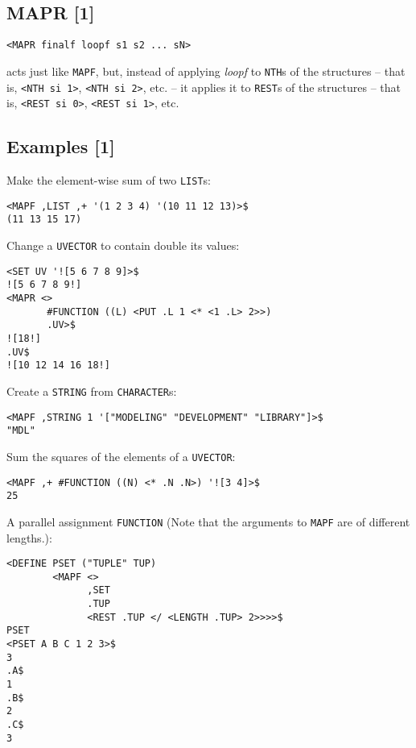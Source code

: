 \documentclass[a4paper]{scrbook}
\begin{document}
\subsection{MAPR {[}1{]}}\label{mapr-1}

\begin{verbatim}
<MAPR finalf loopf s1 s2 ... sN>
\end{verbatim}

 acts just like \texttt{MAPF}, but, instead of applying \emph{loopf} to \texttt{NTH}s of the
structures -- that is, \texttt{\textless{}NTH\ si\ 1\textgreater{}}, \texttt{\textless{}NTH\ si\ 2\textgreater{}}, etc. --
it applies it to \texttt{REST}s of the structures -- that is, \texttt{\textless{}REST\ si\ 0\textgreater{}},
\texttt{\textless{}REST\ si\ 1\textgreater{}}, etc.

\subsection{Examples {[}1{]}}\label{examples-1-3}

Make the element-wise sum of two \texttt{LIST}s:

\begin{verbatim}
<MAPF ,LIST ,+ '(1 2 3 4) '(10 11 12 13)>$
(11 13 15 17)
\end{verbatim}

Change a \texttt{UVECTOR} to contain double its values:

\begin{verbatim}
<SET UV '![5 6 7 8 9]>$
![5 6 7 8 9!]
<MAPR <>
       #FUNCTION ((L) <PUT .L 1 <* <1 .L> 2>>)
       .UV>$
![18!]
.UV$
![10 12 14 16 18!]
\end{verbatim}

Create a \texttt{STRING} from \texttt{CHARACTER}s:

\begin{verbatim}
<MAPF ,STRING 1 '["MODELING" "DEVELOPMENT" "LIBRARY"]>$
"MDL"
\end{verbatim}

Sum the squares of the elements of a \texttt{UVECTOR}:

\begin{verbatim}
<MAPF ,+ #FUNCTION ((N) <* .N .N>) '![3 4]>$
25
\end{verbatim}

A parallel assignment \texttt{FUNCTION} (Note that the arguments to \texttt{MAPF} are of different lengths.):

\begin{verbatim}
<DEFINE PSET ("TUPLE" TUP)
        <MAPF <>
              ,SET
              .TUP
              <REST .TUP </ <LENGTH .TUP> 2>>>>$
PSET
<PSET A B C 1 2 3>$
3
.A$
1
.B$
2
.C$
3
\end{verbatim}
\end{document}
